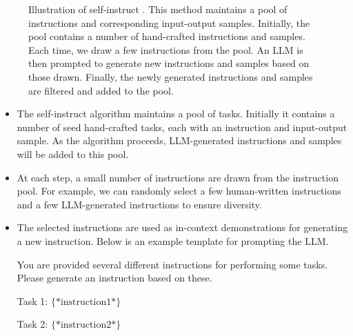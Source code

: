 \begin{figure}[!t]
\centering

\caption{Illustration of self-instruct \cite{wang-etal:2023self}. This method maintains a pool of instructions and corresponding input-output samples. Initially, the pool contains a number of hand-crafted instructions and samples. Each time, we draw a few instructions from the pool. An LLM is then prompted to generate new instructions and samples based on those drawn. Finally, the newly generated instructions and samples are filtered and added to the pool.}
\label{fig:self-instruct}
\end{figure}

\begin{itemize}
\item \vspace{0.5em} The self-instruct algorithm maintains a pool of tasks. Initially it contains a number of seed hand-crafted tasks, each with an instruction and input-output sample. As the algorithm proceeds, LLM-generated instructions and samples will be added to this pool.
\item \vspace{0.3em} At each step, a small number of instructions are drawn from the instruction pool. For example, we can randomly select a few human-written instructions and a few LLM-generated instructions to ensure diversity.
    \newpage
\item \vspace{0.3em} The selected instructions are used as in-context demonstrations for generating a new instruction. Below is an example template for prompting the LLM.

    \vspace{0.5em}
    \begin{tcolorbox}

    \begingroup
    \setlength{\leftskip}{2em}
    \setlength{\rightskip}{2em}

    You are provided several different instructions for performing some tasks. Please generate an instruction based on these.

    \vspace{0.2cm}

    Task 1: $\{*\mathrm{instruction}1*\}$

    \vspace{0.2cm}

    Task 2: $\{*\mathrm{instruction}2*\}$

    \vspace{0.2cm}


\end{tcolorbox}
\end{itemize}
